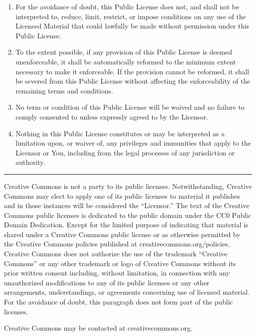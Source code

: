 \documentclass[
]{scrbook}
\begin{document}
\begin{enumerate}
\def\labelenumi{\alph{enumi}.}
\item
  For the avoidance of doubt, this Public License does not, and shall
  not be interpreted to, reduce, limit, restrict, or impose conditions
  on any use of the Licensed Material that could lawfully be made
  without permission under this Public License.
\item
  To the extent possible, if any provision of this Public License is
  deemed unenforceable, it shall be automatically reformed to the
  minimum extent necessary to make it enforceable. If the provision
  cannot be reformed, it shall be severed from this Public License
  without affecting the enforceability of the remaining terms and
  conditions.
\item
  No term or condition of this Public License will be waived and no
  failure to comply consented to unless expressly agreed to by the
  Licensor.
\item
  Nothing in this Public License constitutes or may be interpreted as a
  limitation upon, or waiver of, any privileges and immunities that
  apply to the Licensor or You, including from the legal processes of
  any jurisdiction or authority.
\end{enumerate}

\begin{center}\rule{0.5\linewidth}{0.5pt}\end{center}

Creative Commons is not a party to its public licenses. Notwithstanding,
Creative Commons may elect to apply one of its public licenses to
material it publishes and in those instances will be considered the
``Licensor.'' The text of the Creative Commons public licenses is
dedicated to the public domain under the CC0 Public Domain Dedication.
Except for the limited purpose of indicating that material is shared
under a Creative Commons public license or as otherwise permitted by the
Creative Commons policies published at creativecommons.org/policies,
Creative Commons does not authorize the use of the trademark ``Creative
Commons'' or any other trademark or logo of Creative Commons without its
prior written consent including, without limitation, in connection with
any unauthorized modifications to any of its public licenses or any
other arrangements, understandings, or agreements concerning use of
licensed material. For the avoidance of doubt, this paragraph does not
form part of the public licenses.

Creative Commons may be contacted at creativecommons.org.
\end{document}
